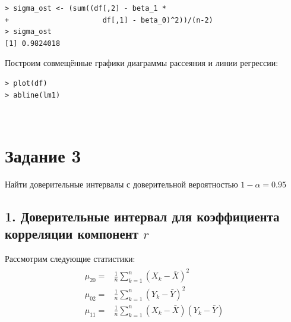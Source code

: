 \documentclass[14pt,a4paper]{scrartcl}
\begin{document}
\begin{verbatim}
> sigma_ost <- (sum((df[,2] - beta_1 * 
+                      df[,1] - beta_0)^2))/(n-2)
> sigma_ost
[1] 0.9824018
\end{verbatim}


Построим совмещённые графики диаграммы рассеяния и линии регрессии:

\begin{verbatim}
> plot(df)
> abline(lm1)
\end{verbatim}


\begin{figure}[H]
	\begin{minipage}[h]{1\linewidth}
		  \\
	\end{minipage}
\end{figure}

\clearpage 
\section*{Задание 3}
Найти доверительные интервалы с доверительной вероятностью $1-\alpha = 0.95$
\subsection*{1. Доверительные интервал для коэффициента корреляции компонент $r$}

Рассмотрим следующие статистики:
\begin{align*}
	\begin{aligned} \mu_{20}=& \frac{1}{n} \sum_{k=1}^{n}\left(X_{k}-\bar{X}\right)^{2}\\ \mu_{02}=& \frac{1}{n} \sum_{k=1}^{n}\left(Y_{k}-\bar{Y}\right)^{2}\\ \mu_{11}=& \frac{1}{n} \sum_{k=1}^{n}\left(X_{k}-\bar{X}\right)\left(Y_{k}-\bar{Y}\right) \end{aligned}
\end{align*}
\end{document}
